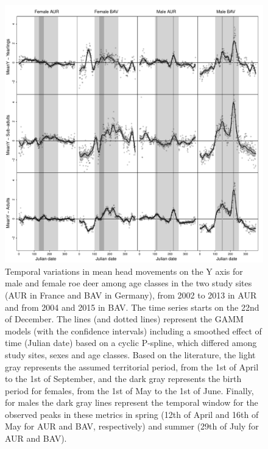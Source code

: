 \documentclass[a4paper,11pt]{article}
\begin{document}
\newpage
\begin{figure} [!h]
  \centering
  \includegraphics[width=0.9\linewidth]{./figures/Fig3b.pdf}
  \caption{Temporal variations in mean head movements on the Y axis
    for male and female roe deer among age classes in the two study
    sites (AUR in France and BAV in Germany), from 2002 to 2013 in AUR
    and from 2004 and 2015 in BAV. The time series starts on the 22nd
    of December. The lines (and dotted lines) represent the GAMM
    models (with the confidence intervals) including a smoothed effect
    of time (Julian date) based on a cyclic P-spline, which differed
    among study sites, sexes and age classes. Based on the literature,
    the light gray represents the assumed territorial period, from the
    1st of April to the 1st of September, and the dark gray represents
    the birth period for females, from the 1st of May to the 1st of
    June. Finally, for males the dark gray lines represent the
    temporal window for the observed peaks in these metrics in spring
    (12th of April and 16th of May for AUR and BAV, respectively) and 
    summer (29th of July for AUR and BAV).}\label{fig:age}
\end{figure}
\end{document}
